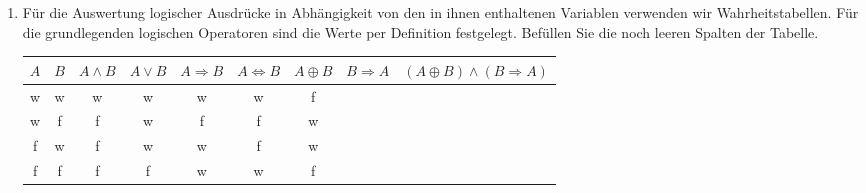 \documentclass[ngerman,11pt]{article}
\begin{document}
\begin {enumerate}
\begin {enumerate}
\begin{enumerate}
    \item Max geht spazieren oder sitzt im Park: \underline{\hspace{4cm}} \\[-1mm]
    \item Wenn es regnet, bleibt Max zu Hause: \underline{\hspace{4cm}} \\[-1mm]
    \item Wenn Max zu Hause ist, liest er entweder ein Buch oder schaut einen Film:\\[4mm] \underline{\hspace{4cm}}\\[-2mm]
    \item Wenn Max spazieren geht, schaut er keinen Film:  \underline{\hspace{4cm}}\\[-2mm]
    \item Wenn Max im Park sitzt und eine Taube sieht, dann fotografiert er sie:\\[4mm] \underline{\hspace{4cm}}\\[-2mm]
\end{enumerate}

Nutzen Sie dafür die folgenden Operatoren: 
\begin{itemize}
    \item ``und'', Konjunktion: $A \land B$
    \item ``oder'', Disjunktion: $A \lor B$
    \item ``nicht'' oder ``kein'', Negation: $\neg A$
    \item ``wenn ... dann'', Implikation: $A \Rightarrow B$
    \item ``entweder oder'', Exklusives oder: $A \oplus B$
\end{itemize}
\end{enumerate}

\item Für die Auswertung logischer Ausdrücke in Abhängigkeit von den in ihnen enthaltenen Variablen verwenden wir Wahrheitstabellen. Für die grundlegenden logischen Operatoren sind die Werte per Definition festgelegt. Befüllen Sie die noch leeren Spalten der Tabelle.

\begin{center}
\begin{tabular}{|c|c||c|c|c|c|c||c|c|}
    \hline
    $A$ & $B$ & $A \land B$ & $A \lor B$ & $A \Rightarrow B$ & $A \Leftrightarrow B$ & $A \oplus B$ & $B \Rightarrow A$ & $(A \oplus B) \land (B \Rightarrow A)$ \\
    \hline
    w  & w  & w & w & w & w & f & & \\
    w  & f  & f & w & f & f & w & & \\
    f  & w  & f & w & w & f & w & & \\
    f  & f  & f & f & w & w & f & & \\
    \hline
\end{tabular}
\end{center}



\end{enumerate}
\end{document}
